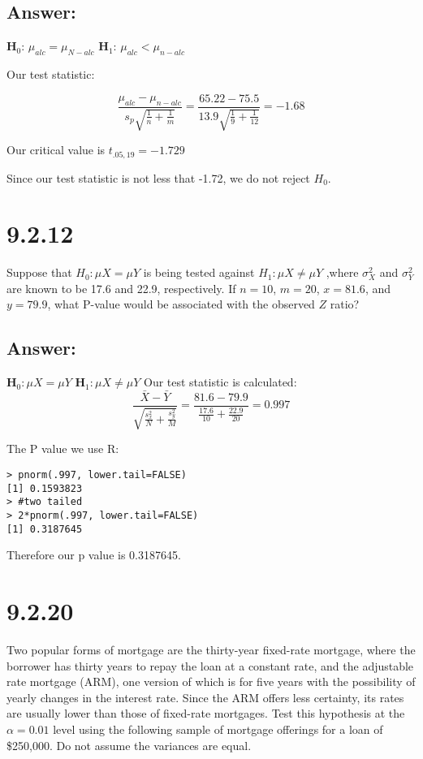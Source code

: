 \documentclass[svgnames]{article}
\begin{document}
\subsection*{Answer:}
\textbf{H$_0$}: $\mu_{alc} = \mu_{N-alc}$
\newline
\textbf{H$_1$}:  $\mu_{alc} < \mu_{n-alc}$

Our test statistic:

$$\frac{\mu_{alc} - \mu_{n - alc}}{s_p\sqrt{\frac{1}{n}+\frac{1}{m}}}=\frac{65.22-75.5}{13.9\sqrt{\frac{1}{9}+\frac{1}{12}}}=-1.68$$

Our critical value is $t_{.05,19}=-1.729$

Since our test statistic is not less that -1.72, we do not reject $H_0$.


\section{9.2.12}

Suppose that $H_0: \mu X = \mu Y$ is being tested against $H_1: \mu X \neq \mu Y$ ,where $\sigma^2_X$ and $\sigma^2_Y$ are known to be 17.6 and 22.9, respectively. If $n = 10$, $m = 20$, $x = 81.6$, and $y = 79.9$, what P-value would be associated with the observed $Z$ ratio?

\subsection*{Answer:}
\textbf{H$_0: \mu X = \mu Y$}
\newline
\textbf{H$_1: \mu X \neq \mu Y$}
\newline
Our test statistic is calculated:
$$\frac{ \bar{X} - \bar{Y}}{\sqrt{\frac{s_x^2}{N} + \frac{s_y^2}{M}}} = \frac{81.6 - 79.9}{\frac{17.6}{10}+\frac{22.9}{20}} = 0.997$$

The P value we use R:

\begin{lstlisting}
> pnorm(.997, lower.tail=FALSE)
[1] 0.1593823
> #two tailed
> 2*pnorm(.997, lower.tail=FALSE)
[1] 0.3187645
\end{lstlisting}

Therefore our p value is 0.3187645. 

\section{9.2.20}

Two popular forms of mortgage are the thirty-year fixed-rate mortgage, where the borrower has thirty years to repay the loan at a constant rate, and the adjustable rate mortgage (ARM), one version of which is for five years with the possibility of yearly changes in the interest rate. Since the ARM offers less certainty, its rates are usually lower than those of fixed-rate mortgages. Test this hypothesis at the $\alpha = 0.01$ level using the following sample of mortgage offerings for a loan of \$250,000. Do not assume the variances are equal.
\end{document}
